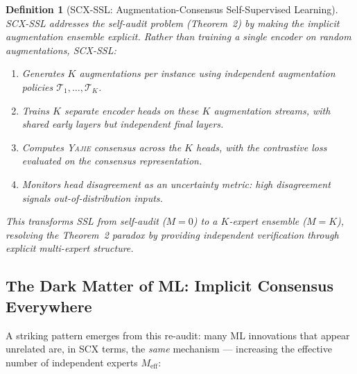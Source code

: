 \documentclass[12pt,a4paper]{article}
\newtheorem{definition}[theorem]{Definition}
\theoremstyle{definition}
\newcommand{\Yajie}{\textsc{Yajie}}
\newcommand{\SCX}{\textsc{SCX}}
\newcommand{\cT}{\mathcal{T}}
\begin{document}
\begin{definition}[SCX-SSL: Augmentation-Consensus Self-Supervised Learning]\label{def:scx_ssl}
\SCX{}-SSL addresses the self-audit problem (Theorem~2) by making the implicit augmentation ensemble explicit. Rather than training a single encoder on random augmentations, \SCX{}-SSL:
\begin{enumerate}[nosep]
    \item Generates $K$ augmentations per instance using \emph{independent} augmentation policies $\cT_1, \ldots, \cT_K$.
    \item Trains $K$ separate encoder heads on these $K$ augmentation streams, with shared early layers but independent final layers.
    \item Computes \Yajie{} consensus across the $K$ heads, with the contrastive loss evaluated on the consensus representation.
    \item Monitors head disagreement as an uncertainty metric: high disagreement signals out-of-distribution inputs.
\end{enumerate}
This transforms SSL from self-audit ($M=0$) to a $K$-expert ensemble ($M=K$), resolving the Theorem~2 paradox by providing independent verification through explicit multi-expert structure.
\end{definition}

\subsection{The Dark Matter of ML: Implicit Consensus Everywhere}

A striking pattern emerges from this re-audit: many ML innovations that appear unrelated are, in \SCX{} terms, the \emph{same} mechanism — increasing the effective number of independent experts $M_{\text{eff}}$:
\end{document}
